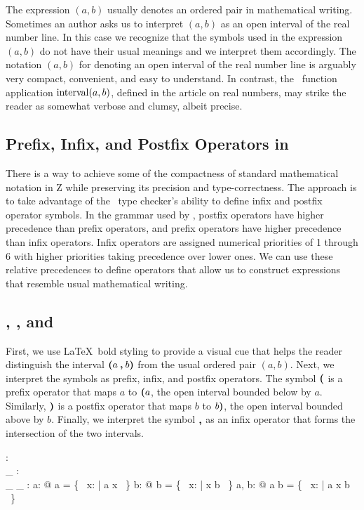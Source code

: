 \documentclass[11pt, oneside]{article}
\begin{document}
The expression $(a,b)$ usually denotes an ordered pair in mathematical writing.
Sometimes an author asks us to interpret $(a,b)$ as an open interval of the real number line.
In this case we recognize that the symbols used in the expression $(a,b)$ do not have their usual meanings
and we interpret them accordingly.
The notation $(a,b)$ for denoting an open interval of the real number line is
arguably very compact, convenient, and easy to understand. 
In contrast, the \Zed\  function application $\operatorname{interval}(a,b)$, defined in the article on real numbers, 
may strike the reader as somewhat verbose and clumsy, albeit precise.

\subsection{Prefix, Infix, and Postfix Operators in \fuzz}

There is a way to achieve some of the compactness of standard mathematical notation in Z while
preserving its precision and type-correctness.
The approach is to take advantage of the \fuzz\ type checker's ability to define infix and postfix 
operator symbols. 
In the grammar used by \fuzz, postfix operators have higher precedence than prefix operators,
and prefix operators have higher precedence than infix operators.
Infix operators are assigned numerical priorities of 1 through 6 with higher priorities taking precedence 
over lower ones.
We can use these relative precedences to define operators that allow us to construct expressions 
that resemble usual mathematical writing.

\subsection{, , and }

First, we use \LaTeX\ bold styling to provide a visual cue that helps the reader
distinguish the interval $\boldsymbol{(} a \mathbin{\boldsymbol{,}} b \boldsymbol{)}$ from the
usual ordered pair $(a,b)$.
Next, we interpret the symbols as prefix, infix, and postfix operators.
The symbol $\boldsymbol{(}$ is a prefix operator that maps $a$ to $\boldsymbol{(} a$, 
the open interval bounded below by $a$.
Similarly, $\boldsymbol{)}$ is a postfix operator that maps $b$ to $b \boldsymbol{)}$, 
the open interval bounded above by $b$.
Finally, we interpret the symbol $\mathbin{\boldsymbol{,}}$ as an infix operator that forms the intersection of the two intervals.

\begin{axdef}
	\lowerBound: \R \fun \power \R \\
	\_ \upperBound: \R \fun \power \R \\
	\_ \intersect \_ : \power \R \cross \power \R \fun \power \R
\where
	\forall a: \R @ \lowerBound a = \{~ x: \R | a \ltR x ~\}
\also
	\forall b: \R @ b \upperBound = \{~ x: \R | x \ltR b ~\}
\also
	\forall a, b: \R @ \lowerBound a \intersect b \upperBound = \{~ x: \R | a \ltR x \ltR b ~\}
\end{axdef}
\end{document}
